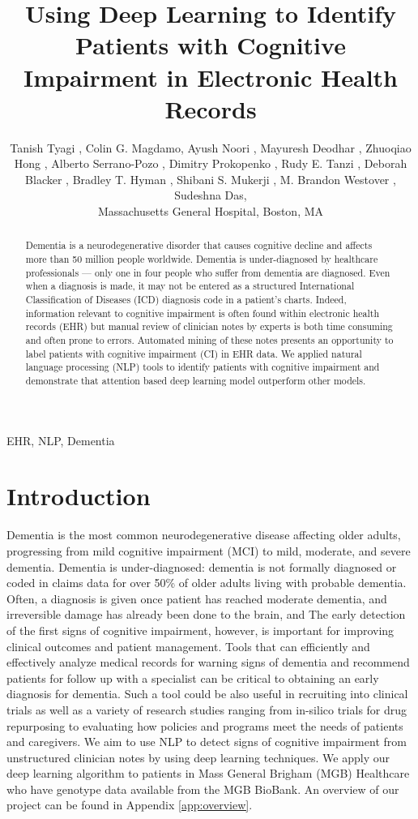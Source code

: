 \documentclass[pmlr,twocolumn,10pt]{jmlr} %
\title[NLP Techniques to Detect Cognitive Impairment]{Using Deep Learning to Identify Patients with Cognitive Impairment in Electronic Health Records}
\author{Tanish Tyagi \nametag{\thanks{Authors contributed equally}\SUP{1}},
Colin G. Magdamo\nametag{\footnotemark[1]\SUP{1}}, 
Ayush Noori \SUP{1},
Mayuresh Deodhar \SUP{1},
Zhuoqiao Hong \SUP{1},
Alberto Serrano-Pozo \SUP{1},
Dimitry Prokopenko \SUP{1},
Rudy E. Tanzi \SUP{2},
Deborah Blacker \SUP{1},
Bradley T. Hyman \SUP{1},
Shibani S. Mukerji \SUP{1},
M. Brandon Westover \SUP{1},
Sudeshna Das\SUP{1},
\centering \Email{
\\[\bigskipamount] 
\SUP{1}\{ttyagi, 
cmagdamo,
anoori1,
mdeodhar,
zhong1,
aserrano1,
dprokopenko,
dblacker,
bhyman,
smukerji,
mwestover,
sdas5\}
@mgh.harvard.edu}
\centering \Email{
\\[\bigskipamount] 
\SUP{2}\{tanzi\}@helix.mgh.harvard.edu
}
% 
\begin{center}\addr Massachusetts General Hospital, Boston, MA\end{center}
}
\begin{document}
\maketitle

\begin{abstract}
\hspace{10mm} Dementia is a neurodegenerative disorder that causes cognitive decline and affects more than 50 million people worldwide. Dementia is under-diagnosed by healthcare professionals — only one in four people who suffer from dementia are diagnosed. Even when a diagnosis is made, it may not be entered as a structured International Classification of Diseases (ICD) diagnosis code in a patient’s charts. Indeed, information relevant to cognitive impairment is often found within electronic health records (EHR) but manual review of clinician notes by experts is both time consuming and often prone to errors. Automated mining of these notes presents an opportunity to label patients with cognitive impairment (CI) in EHR data. We applied natural language processing (NLP) tools to identify patients with cognitive impairment and demonstrate that attention based deep learning model outperform other models. 
\end{abstract}

\begin{keywords}
EHR, NLP, Dementia
\end{keywords}

\section{Introduction}
\label{sec:intro} Dementia is the most common neurodegenerative disease affecting older adults, progressing from mild cognitive impairment (MCI) to mild, moderate, and severe dementia. Dementia is under-diagnosed: dementia is not formally diagnosed or coded in claims data for over 50\% of older adults living with probable dementia. Often, a diagnosis is given once patient has reached moderate dementia, and irreversible damage has already been done to the brain, and 
The early detection of the first signs of cognitive impairment, however, is important for improving clinical outcomes and patient management. Tools that can efficiently and effectively analyze medical records for warning signs of dementia and recommend patients for follow up with a specialist can be critical to obtaining an early diagnosis for dementia. Such a tool could be also useful in recruiting into clinical trials as well as a variety of research studies ranging from in-silico trials for drug repurposing to evaluating how policies and programs meet the needs of patients and caregivers.  We aim to use NLP to detect signs of cognitive impairment from unstructured clinician notes by using deep learning techniques. We apply our deep learning algorithm to patients in Mass General Brigham (MGB) Healthcare who have genotype data available from the MGB BioBank. An overview of our project can be found in Appendix \ref{app:overview}. 
\end{document}
